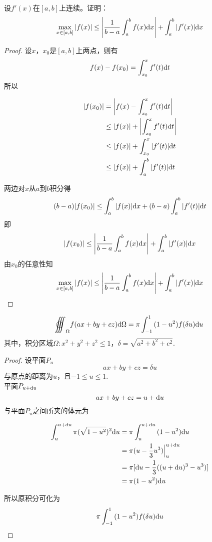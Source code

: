 \begin{proposition}
    
    设$f'(x)$在$[a, b]$上连续。证明：
    \[\max_{x\in[a, b]}{|f(x)|} \leq \left| \dfrac{1}{b - a}\int_{a}^{b}{f(x)}\mathrm{d} x \right| + \int_{a}^{b}{|f'(x)|}\mathrm{d} x\]

\end{proposition}

\begin{proof}

    设$x$，$x_0$是$[a, b]$上两点，则有
    \[f(x) - f(x_0) = \int_{x_0}^{x}{f'(t)}\mathrm{d} t\]
    所以

    \begin{align*}
        |f(x_0)| & = \left| f(x) - \int_{x_0}^{x}{f'(t)}\mathrm{d} t \right| \\
        & \leq |f(x)| + \left| \int_{x_0}^{x}{f'(t)}\mathrm{d} t \right| \\
        & \leq |f(x)| +  \int_{x_0}^{x}{|f'(t)|}\mathrm{d} t \\
        & \leq |f(x)| +  \int_{a}^{b}{|f'(t)|}\mathrm{d} t \\
    \end{align*}

    两边对$x$从$a$到$b$积分得
    \[(b - a)|f(x_0)| \leq \int_{a}^{b}{|f(x)|}\mathrm{d} x + (b - a)\int_{a}^{b}{|f'(t)|}\mathrm{d} t\]
    即
    \[|f(x_0)| \leq \left| \dfrac{1}{b - a}\int_{a}^{b}{f(x)}\mathrm{d} x \right| + \int_{a}^{b}{|f'(x)|}\mathrm{d} x\]
    由$x_0$的任意性知
    \[\max_{x\in[a, b]}{|f(x)|} \leq \left| \dfrac{1}{b - a}\int_{a}^{b}{f(x)}\mathrm{d} x \right| + \int_{a}^{b}{|f'(x)|}\mathrm{d} x\]
    
\end{proof}

\begin{theorem}

    \[\oooint_{\Omega}{f(ax + by + cz)}\diff \Omega = \pi \int_{-1}^{1}{(1 - u^2)f(\delta u)}\diff u\]
    其中，积分区域$\Omega: x^2 + y^2 + z^2 \leq 1$，$\delta = \sqrt{a^2 + b^2 + c^2}$.

\end{theorem}

\begin{proof}

    设平面$P_u$
    \[ax + by + cz = \delta u\]
    与原点的距离为$u$，且$-1 \leq u \leq 1$. \\
    平面$P_{u + \mathrm{d} u}$
    \[ax + by + cz = u + \mathrm{d} u\]
    与平面$P_u$之间所夹的体元为
    
    \begin{align*}
        \int_{u}^{u + \mathrm{d} u}{\pi (\sqrt{1 - u^2})^2}\mathrm{d} u & = \pi \int_{u}^{u + \mathrm{d} u}{(1 - u^2)}\mathrm{d} u \\
        & = \pi (u - \dfrac{1}{3}u^3) \Big|_{u}^{u + \mathrm{d} u} \\
        & = \pi [\mathrm{d} u - \dfrac{1}{3}((u + \mathrm{d} u)^3 - u^3)] \\
        & = \pi (1 - u^2)\mathrm{d} u
    \end{align*}

    所以原积分可化为
    \[\pi \int_{-1}^{1}{(1 - u^2)f(\delta u)}\mathrm{d} u\]

\end{proof}

